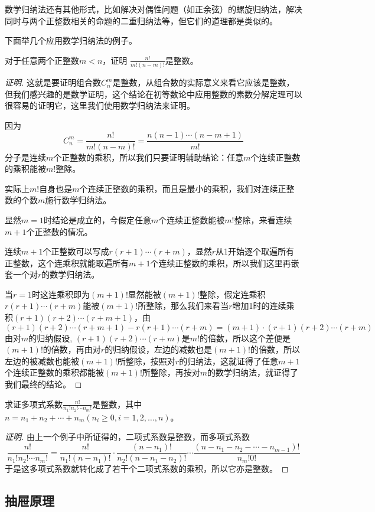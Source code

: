 数学归纳法还有其他形式，比如解决对偶性问题（如正余弦）的螺旋归纳法，解决同时与两个正整数相关的命题的二重归纳法等，但它们的道理都是类似的。

下面举几个应用数学归纳法的例子。

\begin{example}
  对于任意两个正整数$m<n$，证明 $\frac{n!}{m!(n-m)!}$是整数。

\begin{proof}[证明]
  这就是要证明组合数$C_n^m$是整数，从组合数的实际意义来看它应该是整数，但我们感兴趣的是数学证明，这个结论在初等数论中应用整数的素数分解定理可以很容易的证明它，这里我们使用数学归纳法来证明。

  因为
  \[ C_n^m = \frac{n!}{m!(n-m)!} = \frac{n(n-1)\cdots(n-m+1)}{m!} \]
  分子是连续$m$个正整数的乘积，所以我们只要证明辅助结论：任意$m$个连续正整数的乘积能被$m!$整除。

  实际上$m!$自身也是$m$个连续正整数的乘积，而且是最小的乘积，我们对连续正整数的个数$m$施行数学归纳法。

  显然$m=1$时结论是成立的，今假定任意$m$个连续正整数能被$m!$整除，来看连续$m+1$个正整数的情况。

  连续$m+1$个正整数可以写成$r(r+1)\cdots (r+m)$，显然$r$从1开始逐个取遍所有正整数，这个连乘积就能取遍所有$m+1$个连续正整数的乘积，所以我们这里再嵌套一个对$r$的数学归纳法。

  当$r=1$时这连乘积即为$(m+1)!$显然能被$(m+1)!$整除，假定连乘积$r(r+1)\cdots (r+m)$能被$(m+1)!$所整除，那么我们来看当$r$增加1时的连续乘积$(r+1)(r+2)\cdots (r+m+1)$，由
  \[ (r+1)(r+2) \cdots (r+m+1) - r(r+1) \cdots (r+m) = (m+1) \cdot (r+1)(r+2) \cdots (r+m) \]
  由对$m$的归纳假设, $(r+1)(r+2) \cdots (r+m)$是$m!$的倍数，所以这个差便是$(m+1)!$的倍数，再由对$r$的归纳假设，左边的减数也是$(m+1)!$的倍数，所以左边的被减数也能被$(m+1)!$所整除，按照对$r$的归纳法，这就证得了任意$m+1$个连续正整数的乘积都能被$(m+1)!$所整除，再按对$m$的数学归纳法，就证得了我们最终的结论。
\end{proof}
\end{example}

\begin{example}
  求证多项式系数$\frac{n!}{n_1!n_2!\cdots n_m!}$是整数，其中$n=n_1+n_2+\cdots+n_m(n_i\geqslant 0, i=1,2,\ldots,n)$。

\begin{proof}[证明]
  由上一个例子中所证得的，二项式系数是整数，而多项式系数
  \[ \frac{n!}{n_1!n_2!\cdots n_m!} = \frac{n!}{n_1!(n-n_1)!} \cdot \frac{(n-n_1)!}{n_2!(n-n_1-n_2)!} \cdots \frac{(n-n_1-n_2-\cdots-n_{m-1})!}{n_m!0!} \]
  于是这多项式系数就转化成了若干个二项式系数的乘积，所以它亦是整数。
\end{proof}
\end{example}

\subsection{抽屉原理}
\label{sec:drawer-principle}



